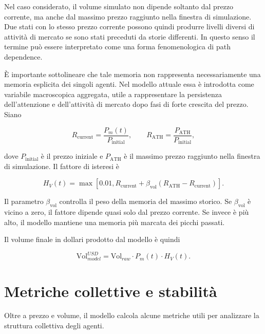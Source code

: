 Nel caso considerato, il volume simulato non dipende soltanto dal prezzo corrente,
ma anche dal massimo prezzo raggiunto nella finestra di simulazione. Due stati con
lo stesso prezzo corrente possono quindi produrre livelli diversi di attività di
mercato se sono stati preceduti da storie differenti. In questo senso il termine
può essere interpretato come una forma fenomenologica di path dependence.

È importante sottolineare che tale memoria non rappresenta necessariamente una
memoria esplicita dei singoli agenti. Nel modello attuale essa è introdotta come
variabile macroscopica aggregata, utile a rappresentare la persistenza
dell'attenzione e dell'attività di mercato dopo fasi di forte crescita del prezzo.
Siano

\begin{equation}
    R_{\mathrm{current}}
    =
    \frac{P_m(t)}{P_{\mathrm{initial}}},
    \qquad
    R_{\mathrm{ATH}}
    =
    \frac{P_{\mathrm{ATH}}}{P_{\mathrm{initial}}},
\end{equation}

dove \(P_{\mathrm{initial}}\) è il prezzo iniziale e \(P_{\mathrm{ATH}}\) è il
massimo prezzo raggiunto nella finestra di simulazione. Il fattore di isteresi è

\begin{equation}
    H_V(t)
    =
    \max
    \left[
    0.01,
    R_{\mathrm{current}}
    +
    \beta_{\mathrm{vol}}
    \left(
    R_{\mathrm{ATH}} -
    R_{\mathrm{current}}
    \right)
    \right].
\end{equation}

Il parametro \(\beta_{\mathrm{vol}}\) controlla il peso della memoria del massimo
storico. Se \(\beta_{\mathrm{vol}}\) è vicino a zero, il fattore dipende quasi
solo dal prezzo corrente. Se invece è più alto, il modello mantiene una memoria
più marcata dei picchi passati.

Il volume finale in dollari prodotto dal modello è quindi

\begin{equation}
    \text{Vol}_{model}^{USD}
    =
    \text{Vol}_{raw}
    \cdot
    P_m(t)
    \cdot
    H_V(t).
\end{equation}

\section{Metriche collettive e stabilità}

Oltre a prezzo e volume, il modello calcola alcune metriche utili per analizzare
la struttura collettiva degli agenti.


